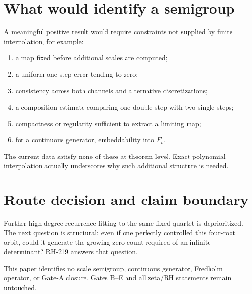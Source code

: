 \documentclass[12pt]{article}
\theoremstyle{remark}\newtheorem{remark}[theorem]{Remark}
\begin{document}
\section{What would identify a semigroup}

A meaningful positive result would require constraints not supplied by
finite interpolation, for example:
\begin{enumerate}[leftmargin=2em]
\item a map fixed before additional scales are computed;
\item a uniform one-step error tending to zero;
\item consistency across both channels and alternative discretizations;
\item a composition estimate comparing one double step with two single
steps;
\item compactness or regularity sufficient to extract a limiting map;
\item for a continuous generator, embeddability into $F_t$.
\end{enumerate}

The current data satisfy none of these at theorem level.  Exact polynomial
interpolation actually underscores why such additional structure is needed.

\section{Route decision and claim boundary}

Further high-degree recurrence fitting to the same fixed quartet is
deprioritized.  The next question is structural: even if one perfectly
controlled this four-root orbit, could it generate the growing zero count
required of an infinite determinant?  RH-219 answers that question.

This paper identifies no scale semigroup, continuous generator, Fredholm
operator, or Gate-A closure.  Gates B--E and all zeta/RH statements remain
untouched.


\end{document}

